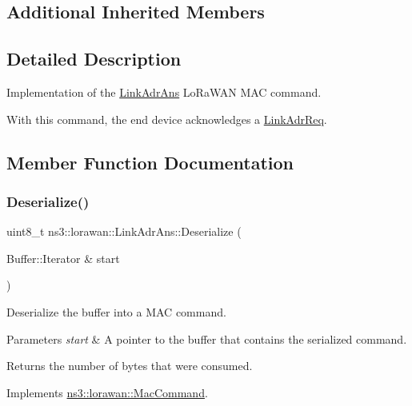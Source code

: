 \subsection*{Additional Inherited Members}


\subsection{Detailed Description}
Implementation of the \hyperlink{classns3_1_1lorawan_1_1LinkAdrAns}{Link\+Adr\+Ans} Lo\+Ra\+W\+AN M\+AC command.

With this command, the end device acknowledges a \hyperlink{classns3_1_1lorawan_1_1LinkAdrReq}{Link\+Adr\+Req}. 

\subsection{Member Function Documentation}
\mbox{\label{classns3_1_1lorawan_1_1LinkAdrAns_a2d90637751496615710c55233a3480a6}} 
\subsubsection{\texorpdfstring{Deserialize()}{Deserialize()}}
{\footnotesize\ttfamily uint8\+\_\+t ns3\+::lorawan\+::\+Link\+Adr\+Ans\+::\+Deserialize (\begin{DoxyParamCaption}\item[{Buffer\+::\+Iterator \&}]{start }\end{DoxyParamCaption})\hspace{0.3cm}{\ttfamily [virtual]}}

Deserialize the buffer into a M\+AC command.


\begin{DoxyParams}{Parameters}
{\em start} & A pointer to the buffer that contains the serialized command. \\
\hline
\end{DoxyParams}
\begin{DoxyReturn}{Returns}
the number of bytes that were consumed. 
\end{DoxyReturn}


Implements \hyperlink{classns3_1_1lorawan_1_1MacCommand_af12d223a71a67196bce498f1240eda75}{ns3\+::lorawan\+::\+Mac\+Command}.

